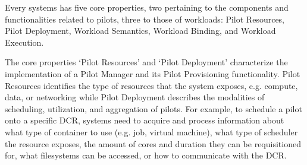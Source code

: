 \documentclass{sig-alternate}
\begin{document}





Every \pilot systems has five core properties, two pertaining to the components
and functionalities related to pilots, three to those of workloads: Pilot
Resources, Pilot Deployment, Workload Semantics, Workload Binding, and Workload
Execution.

The core properties `Pilot Resources' and `Pilot Deployment' characterize the
implementation of a Pilot Manager and its Pilot Provisioning functionality.
Pilot Resources identifies the type of resources that the \pilot system exposes,
e.g. compute, data, or networking while Pilot Deployment describes the
modalities of scheduling, utilization, and aggregation of pilots. For example,
to schedule a pilot onto a specific DCR, \pilot systems need to acquire and
process information about what type of container to use (e.g. job, virtual
machine), what type of scheduler the resource exposes, the amount of cores and
duration they can be requisitioned for, what filesystems can be accessed, or how
to communicate with the DCR.
\end{document}
